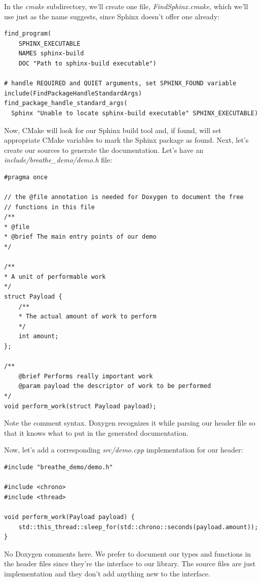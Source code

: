 In the \textit{cmake} subdirectory, we'll create one file, \textit{FindSphinx.cmake}, which we'll use just as the name suggests, since Sphinx doesn't offer one already:


\begin{lstlisting}[style=styleCMake]
find_program(
	SPHINX_EXECUTABLE
	NAMES sphinx-build
	DOC "Path to sphinx-build executable")

# handle REQUIRED and QUIET arguments, set SPHINX_FOUND variable
include(FindPackageHandleStandardArgs)
find_package_handle_standard_args(
  Sphinx "Unable to locate sphinx-build executable" SPHINX_EXECUTABLE)

\end{lstlisting}

Now, CMake will look for our Sphinx build tool and, if found, will set appropriate CMake variables to mark the Sphinx package as found. Next, let's create our sources to generate the documentation. Let's have an \textit{include/breathe\_demo/demo.h} file:

\begin{lstlisting}[style=styleCXX]
#pragma once

// the @file annotation is needed for Doxygen to document the free
// functions in this file
/**
* @file
* @brief The main entry points of our demo
*/

/**
* A unit of performable work
*/
struct Payload {
	/**
	* The actual amount of work to perform
	*/
	int amount;
};

/**
	@brief Performs really important work
	@param payload the descriptor of work to be performed
*/
void perform_work(struct Payload payload);
\end{lstlisting}

Note the comment syntax. Doxygen recognizes it while parsing our header file so that it knows what to put in the generated documentation.

Now, let's add a corresponding \textit{src/demo.cpp} implementation for our header:

\begin{lstlisting}[style=styleCXX]
#include "breathe_demo/demo.h"

#include <chrono>
#include <thread>

void perform_work(Payload payload) {
	std::this_thread::sleep_for(std::chrono::seconds(payload.amount));
}	
\end{lstlisting}

No Doxygen comments here. We prefer to document our types and functions in the header files since they're the interface to our library. The source files are just implementation and they don't add anything new to the interface.

